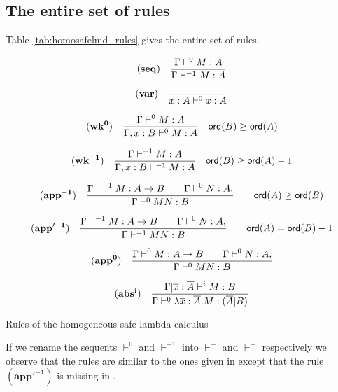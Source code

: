 \subsection{The entire set of rules}

Table \ref{tab:homosafelmd_rules} gives the entire set of rules.


\begin{table}[htbp]
$$ \mathbf{(seq)} \quad \frac{\displaystyle \Gamma \vdash^{0} M : A}{\Gamma \vdash^{-1} M : A} $$

$$ \mathbf{(var)} \quad  \frac{\displaystyle }{x : A\vdash^{0} x : A} $$

$$ \mathbf{(wk^{0})} \quad  \frac{\displaystyle \Gamma \vdash^{0} M : A}{\Gamma , x : B \vdash^{0} M : A} \quad {\sf ord}(B) \geq {\sf ord}(A) $$

$$ \mathbf{(wk^{-1})} \quad  \frac{\displaystyle \Gamma \vdash^{-1} M : A}{\Gamma , x : B \vdash^{-1} M : A} \quad {\sf ord}(B) \geq {\sf ord}(A) -1$$


$$ \mathbf{(app^{-1})} \quad  \frac{\displaystyle \Gamma \vdash^{-1} M : A\rightarrow B
                                        \qquad \Gamma \vdash^0 N : A,
                                   }{\Gamma  \vdash^0 M N : B}
                                    \qquad {\sf ord}(A) \geq {\sf ord}(B)$$

$$ \mathbf{(app'^{-1})} \quad  \frac{\displaystyle \Gamma \vdash^{-1} M : A\rightarrow B
                                        \qquad \Gamma \vdash^0 N : A,
                                   }{\Gamma  \vdash^{-1} M N : B}
                                    \qquad {\sf ord}(A) = {\sf ord}(B) - 1$$

$$ \mathbf{(app^0)} \quad  \frac{\displaystyle \Gamma \vdash^0 M : A\rightarrow B
                                        \qquad \Gamma \vdash^{0} N : A,
                                   }{\Gamma  \vdash^{0} M N : B}$$

$$ \mathbf{(abs^i)} \quad  \frac{\displaystyle \Gamma| \overline{x} : \overline{A} \vdash^{i} M : B}{\Gamma  \vdash^{0} \lambda \overline{x} : \overline{A} . M : (\overline{A}|B)}$$
\caption{Rules of the homogeneous safe lambda calculus}
\label{tab:homosafelmd_rules}
\end{table}


If we rename the sequents $\vdash^{0}$ and $\vdash^{-1}$ into
$\vdash^+$ and $\vdash^{-}$ respectively we observe that the rules
are similar to the ones given in \cite{Ong2005} except that the rule
$\mathbf{(app'^{-1})}$ is missing in \cite{Ong2005}.
